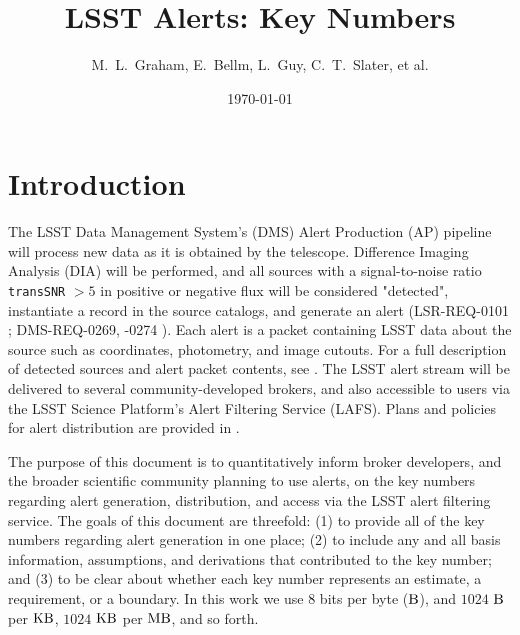 \documentclass[DM,authoryear,toc]{lsstdoc}
\title[Alerts Key Numbers]{LSST Alerts: Key Numbers}
\author{%
M.~L.~Graham, E.~Bellm, L.~Guy, C.~T.~Slater, et al.
}
\date{\today}
\begin{document}
\maketitle

\section{Introduction} \label{sec:intro}

The LSST Data Management System's (DMS) Alert Production (AP) pipeline will process new data as it is obtained by the telescope. Difference Imaging Analysis (DIA) will be performed, and all sources with a signal-to-noise ratio {\tt transSNR} $>5$ in positive or negative flux will be considered "detected", instantiate a record in the source catalogs, and generate an alert (LSR-REQ-0101 ; DMS-REQ-0269, -0274 ). Each alert is a packet containing LSST data about the source such as coordinates, photometry, and image cutouts. For a full description of detected sources and alert packet contents, see . The LSST alert stream will be delivered to several community-developed brokers, and also accessible to users via the LSST Science Platform's Alert Filtering Service (LAFS). Plans and policies for alert distribution are provided in . 

The purpose of this document is to quantitatively inform broker developers, and the broader scientific community planning to use alerts, on the key numbers regarding alert generation, distribution, and access via the LSST alert filtering service. The goals of this document are threefold: (1) to provide all of the key numbers regarding alert generation in one place; (2) to include any and all basis information, assumptions, and derivations that contributed to the key number; and (3) to be clear about whether each key number represents an estimate, a requirement, or a boundary. In this work we use 8 bits per byte ($\rm B$), and $1024$ $\rm B$ per $\rm KB$, $1024$ $\rm KB$ per $\rm MB$, and so forth.
\end{document}
